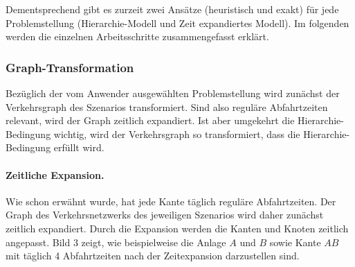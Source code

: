 Dementsprechend gibt es zurzeit zwei Ansätze (heuristisch und exakt) für jede Problemstellung (Hierarchie-Modell und Zeit expandiertes Modell). Im folgenden werden die einzelnen Arbeitsschritte zusammengefasst erklärt.

\subsubsection{Graph-Transformation}
Bezüglich der vom Anwender ausgewählten Problemstellung wird zunächst der Verkehrsgraph des Szenarios transformiert. Sind also reguläre Abfahrtzeiten relevant, wird der Graph zeitlich expandiert. Ist aber umgekehrt die Hierarchie-Bedingung wichtig, wird der Verkehrsgraph so transformiert, dass die Hierarchie-Bedingung erfüllt wird.

\paragraph{Zeitliche Expansion.}
Wie schon erwähnt wurde, hat jede Kante täglich reguläre Abfahrtzeiten. Der Graph des Verkehrsnetzwerks des jeweiligen Szenarios wird daher zunächst zeitlich expandiert. Durch die Expansion werden die Kanten und Knoten zeitlich angepasst. Bild 3 zeigt, wie beispielweise die Anlage $A$ und $B$ sowie Kante $AB$ mit täglich 4 Abfahrtzeiten nach der Zeitexpansion darzustellen sind.

